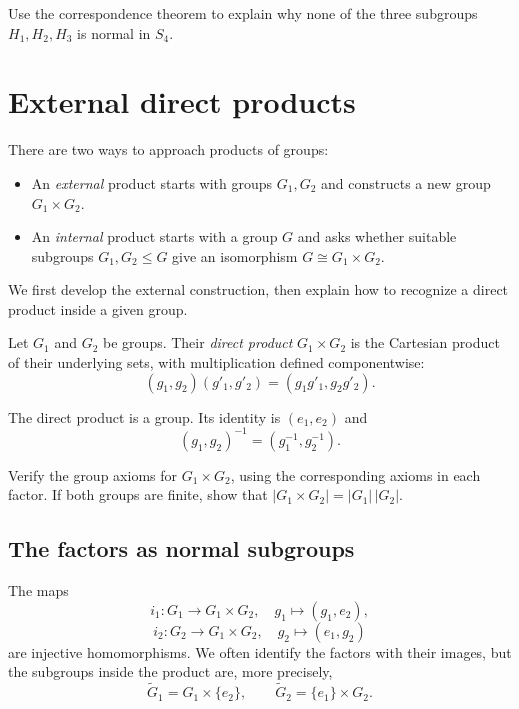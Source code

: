 \documentclass[reqno,11pt]{amsart}
\begin{document}
\begin{exercise}
Use the correspondence theorem to explain why none of the three
subgroups $H_1,H_2,H_3$ is normal in $S_4$.
\end{exercise}

\section{External direct products}

There are two ways to approach products of groups:
\begin{itemize}
  \item An \emph{external} product starts with groups $G_1,G_2$ and
  constructs a new group $G_1\times G_2$.
  \item An \emph{internal} product starts with a group $G$ and asks
  whether suitable subgroups $G_1,G_2\leq G$ give an isomorphism
  $G\cong G_1\times G_2$.
\end{itemize}
We first develop the external construction, then explain how to recognize
a direct product inside a given group.

\begin{define}
Let $G_1$ and $G_2$ be groups. Their \emph{direct product}
$G_1\times G_2$ is the Cartesian product of their underlying sets,
with multiplication defined componentwise:
\[
  (g_1,g_2)(g'_1,g'_2)=(g_1g'_1,g_2g'_2).
\]
\end{define}

\begin{lemma}\label{lem:product-group}
The direct product is a group. Its identity is $(e_1,e_2)$ and
\[
  (g_1,g_2)^{-1}=(g_1^{-1},g_2^{-1}).
\]
\end{lemma}

\begin{exercise}
Verify the group axioms for $G_1\times G_2$, using the corresponding
axioms in each factor. If both groups are finite, show that
$|G_1\times G_2|=|G_1|\,|G_2|$.
\end{exercise}

\subsection{The factors as normal subgroups}

The maps
\[
  i_1:G_1\longrightarrow G_1\times G_2,\quad g_1\longmapsto(g_1,e_2),
\]
\[
  i_2:G_2\longrightarrow G_1\times G_2,\quad g_2\longmapsto(e_1,g_2)
\]
are injective homomorphisms. We often identify the factors with their
images, but the subgroups inside the product are, more precisely,
\[
  \widetilde G_1=G_1\times\{e_2\},\qquad
  \widetilde G_2=\{e_1\}\times G_2.
\]
\end{document}

